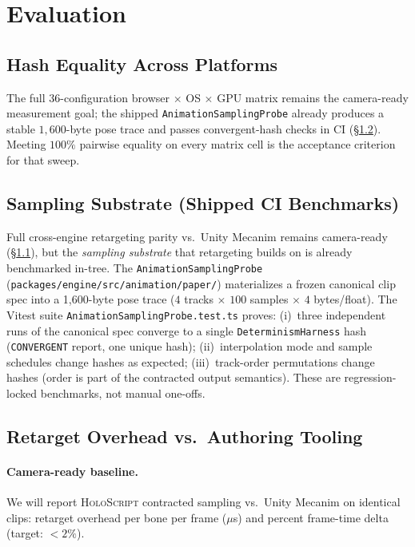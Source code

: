 \documentclass[sigconf,nonacm]{acmart}
\newcommand{\holoscript}{\textsc{HoloScript}}
\begin{document}
\section{Evaluation}
\label{sec:eval}

\subsection{Hash Equality Across Platforms}
\label{sec:eval:hash}
The full $36$-configuration browser $\times$ OS $\times$ GPU matrix
remains the camera-ready measurement goal; the shipped
\texttt{AnimationSamplingProbe} already produces a stable
$1{,}600$-byte pose trace and passes convergent-hash checks in CI
(\S\ref{sec:eval:substrate}). Meeting $100\%$ pairwise equality on
every matrix cell is the acceptance criterion for that sweep.

\subsection{Sampling Substrate (Shipped CI Benchmarks)}
\label{sec:eval:substrate}
Full cross-engine retargeting parity vs.\ Unity Mecanim remains camera-ready
(\S\ref{sec:eval:hash}), but the \emph{sampling substrate} that retargeting
builds on is already benchmarked in-tree.
The \texttt{AnimationSamplingProbe} (\texttt{packages/engine/src/animation/paper/})
materializes a frozen canonical clip spec into a 1{,}600-byte pose trace
($4$ tracks $\times$ $100$ samples $\times$ $4$ bytes/float).
The Vitest suite \texttt{AnimationSamplingProbe.test.ts} proves:
(i)~three independent runs of the canonical spec converge to a single
\texttt{DeterminismHarness} hash (\texttt{CONVERGENT} report, one unique hash);
(ii)~interpolation mode and sample schedules change hashes as expected;
(iii)~track-order permutations change hashes (order is part of the contracted
output semantics).
These are regression-locked benchmarks, not manual one-offs.
\subsection{Retarget Overhead vs.\ Authoring Tooling}
\paragraph{Camera-ready baseline.}
We will report \holoscript{} contracted sampling vs.\ Unity Mecanim on identical
clips: retarget overhead per bone per frame ($\mu$s) and percent frame-time
delta (target: $<2\%$).
\end{document}
